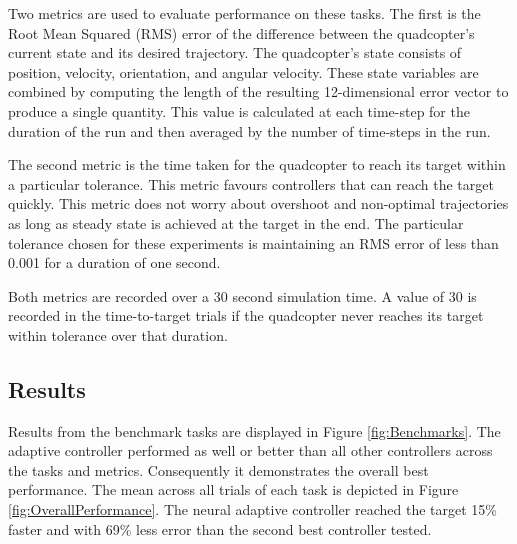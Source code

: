 \documentclass[letterpaper, 10 pt, conference]{ieeeconf}  %
\begin{document}
Two metrics are used to evaluate performance on these tasks. 
The first is the Root Mean Squared (RMS) error of the difference between the quadcopter's current state and its desired trajectory.
The quadcopter's state consists of position, velocity, orientation, and angular velocity.
These state variables are combined by computing the length of the resulting 12-dimensional error vector to produce a single quantity.
This value is calculated at each time-step for the duration of the run and then averaged by the number of time-steps in the run.

The second metric is the time taken for the quadcopter to reach its target within a particular tolerance. 
This metric favours controllers that can reach the target quickly.
This metric does not worry about overshoot and non-optimal trajectories as long as steady state is achieved at the target in the end.
The particular tolerance chosen for these experiments is maintaining an RMS error of less than 0.001 for a duration of one second.

Both metrics are recorded over a 30 second simulation time.
A value of 30 is recorded in the time-to-target trials if the quadcopter never reaches its target within tolerance over that duration.

\subsection{Results}

Results from the benchmark tasks are displayed in Figure \ref{fig:Benchmarks}.
The adaptive controller performed as well or better than all other controllers across the tasks and metrics.
Consequently it demonstrates the overall best performance.
The mean across all trials of each task is depicted in Figure \ref{fig:OverallPerformance}.
The neural adaptive controller reached the target 15\% faster and with 69\% less error than the second best controller tested.

\end{document}

